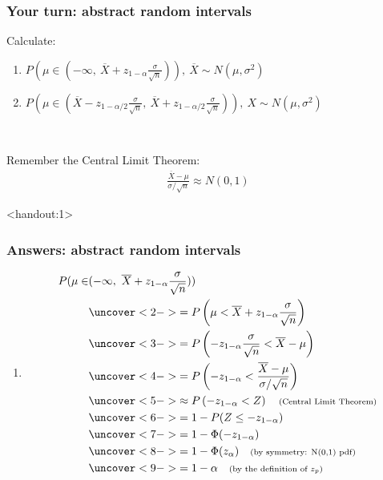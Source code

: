 \documentclass[handout]{beamer}\usepackage[]{graphicx}\usepackage[]{color}
\newcommand{\answers}{1}
\providecommand{\ov}[1]{\overline{#1}}
\providecommand{\q}{$\quad$ \newline}
\numberwithin{equation}{section}
\begin{document}
\begin{frame}
\frametitle{Your turn: abstract random intervals}
Calculate: \q
\begin{enumerate}[1. ]
\item $P(\mu \in (-\infty, \ \ov{X} + z_{1 - \alpha} \frac{\sigma}{\sqrt{n}})), \ \ov{X} \sim N(\mu, \sigma^2)$
\item $P(\mu \in (\ov{X} - z_{1 - \alpha/2} \frac{\sigma}{\sqrt{n}}, \ \ov{X} + z_{1 - \alpha/2} \frac{\sigma}{\sqrt{n}})), \ X \sim N(\mu, \sigma^2)$
\end{enumerate} \q

Remember the Central Limit Theorem:
\begin{align*}
\frac{\ov{X} - \mu}{\sigma/\sqrt{n}} \approx N(0,1)
\end{align*}

\end{frame}


\begin{frame}<handout:\answers>
\frametitle{Answers: abstract random intervals}
\begin{enumerate}

\item
\begin{align*}
P(\mu \in &(-\infty, \ \ov{X} + z_{1 - \alpha} \frac{\sigma}{\sqrt{n}})) \\
&\uncover<2->{= P\left ( \mu <  \ov{X} + z_{1 - \alpha} \frac{\sigma}{\sqrt{n}}\right)} \\
&\uncover<3->{= P\left (- z_{1 - \alpha} \frac{\sigma}{\sqrt{n}} < \ov{X} - \mu \right )} \\
&\uncover<4->{ = P \left (- z_{1 - \alpha} < \frac{\ov{X} - \mu}{\sigma/\sqrt{n}} \right )} \\
&\uncover<5->{\approx P\left (-z_{1 - \alpha} < Z \right) \quad \text{\scriptsize (Central Limit Theorem)}} \\
&\uncover<6->{ = 1 - P(Z \le -z_{1-\alpha})} \\
&\uncover<7->{= 1 - \Phi(-z_{1 - \alpha})} \\
&\uncover<8->{= 1 - \Phi(z_{\alpha}) \quad \text{\scriptsize(by symmetry: N(0,1) pdf)}} \\
&\uncover<9->{= 1 - \alpha \quad \text{\scriptsize (by the definition of $z_p$)}}
\end{align*}
\end{enumerate}
\end{frame}
\end{document}
